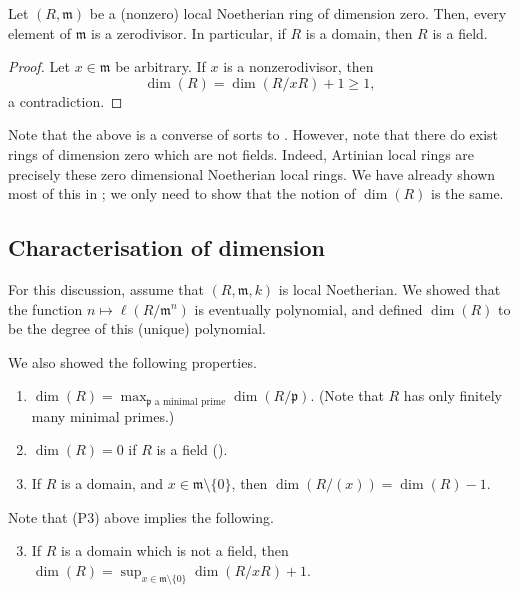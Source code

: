 \documentclass[12pt]{article}
\begin{document}
\begin{cor} \label{cor:dimension-zero-domain-field}
	Let $(R, \mathfrak{m})$ be a (nonzero) local Noetherian ring of dimension zero. \newline
	Then, every element of $\mathfrak{m}$ is a zerodivisor. In particular, if $R$ is a domain, then $R$ is a field.
\end{cor}
\begin{proof} 
	Let $x \in \mathfrak{m}$ be arbitrary. If $x$ is a nonzerodivisor, then
	\begin{equation*} 
		\dim(R) = \dim(R/xR) + 1 \ge 1,
	\end{equation*}
	a contradiction.
\end{proof}
Note that the above is a converse of sorts to . However, note that there do exist rings of dimension zero which are not fields. Indeed, Artinian local rings are precisely these zero dimensional Noetherian local rings. \newline
We have already shown most of this in ; we only need to show that the notion of $\dim(R)$ is the same.

\subsection{Characterisation of dimension}

For this discussion, assume that $(R, \mathfrak{m}, k)$ is local Noetherian. We showed that the function $n \mapsto \ell(R/\mathfrak{m}^{n})$ is eventually polynomial, and defined $\dim(R)$ to be the degree of this (unique) polynomial. 

We also showed the following properties.

\begin{enumerate}[label=(P\arabic*)]
	\item $\dim(R) = \max_{\mathfrak{p} \text{ a minimal prime}} \dim(R/\mathfrak{p})$. \newline
	(Note that $R$ has only finitely many minimal primes.)
	\item $\dim(R) = 0$ if $R$ is a field ().
	\item If $R$ is a domain, and $x \in \mathfrak{m} \setminus \{0\}$, then $\dim(R/(x)) = \dim(R) - 1$.
\end{enumerate}
Note that (P3) above implies the following.
\begin{enumerate}[label=(P\arabic*')]
	\setcounter{enumi}{2}
	\item If $R$ is a domain which is not a field, then $\dim(R) = \sup_{x \in \mathfrak{m} \setminus \{0\}} \dim(R/xR) + 1$.
\end{enumerate}
\end{document}
